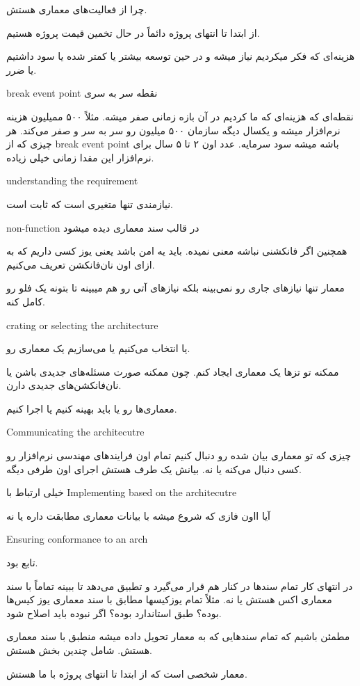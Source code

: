 \documentclass[a4paper]{article}
\begin{document}
چرا از فعالیت‌های معماری هستش.

از ابتدا تا انتهای پروژه دائماً در حال تخمین قیمت پروژه هستیم.

هزینه‌ای که فکر میکردیم نیاز میشه و در حین توسعه بیشتر یا کمتر شده یا سود داشتیم
یا ضرر.

break event point نقطه سر به سری

نقطه‌ای که هزینه‌ای که ما کردیم در آن بازه زمانی صفر میشه. مثلاً ۵۰۰ ممیلیون
هزینه نرم‌افزار میشه و یکسال دیگه سازمان ۵۰۰ میلیون رو سر به سر و صفر می‌کند. هر
چیزی که از break event point باشه میشه سود سرمایه. عدد اون ۲ تا ۵ سال برای
نرم‌افزار این مقدا زمانی خیلی زیاده. 

understanding the requirement

نیازمندی تنها متغیری است که ثابت است.

non-function در قالب سند معماری دیده میشود

همچنین اگر فانکشنی نباشه معنی نمیده. باید یه امن باشد یعنی یوز کسی داریم که به
ازای اون نان‌فانکشن تعریف می‌کنیم.

معمار تنها نیاز‌های جاری رو نمی‌بینه بلکه نیاز‌های آتی رو هم میبینه تا بتونه یک
فلو رو کامل کنه.

crating or selecting the architecture

یا انتخاب می‌کنیم یا می‌سازیم یک معماری رو.

ممکنه تو تز‌ها یک معماری ایجاد کنم. چون ممکنه صورت مسئله‌های جدیدی باشن یا
نان‌فانکشن‌های جدیدی دارن.

معماری‌ها رو یا باید بهینه کنیم یا اجرا کنیم.

Communicating the architecutre

چیزی که تو معماری بیان شده رو دنبال کنیم تمام اون فرایند‌های مهندسی نرم‌افزار رو
کسی دنبال می‌کنه یا نه. بیانش یک طرف هستش اجرای اون طرفی دیگه.

خیلی ارتباط با Implementing based on the architecutre

آیا ااون فازی که شروع میشه با بیانات معماری مطابقت داره یا نه

Ensuring conformance to an arch

تابع بود.

در انتهای کار تمام سند‌ها در کنار هم قرار می‌گیرد و تطبیق می‌دهد تا ببینه تماماً
با سند معماری اکس هستش یا نه. مثلاً تمام یوز‌کیسها مطابق با سند معماری یوز
کیس‌ها بوده؟ طبق استاندارد بوده؟ اگر نبوده باید اصلاح شود.

مطمئن باشیم که تمام سند‌هایی که به معمار تحویل داده میشه منطبق با سند معماری
هستش. شامل چندین بخش هستش.

معمار شخصی است که از ابتدا تا انتهای پروژه با ما هستش.
\end{document}
